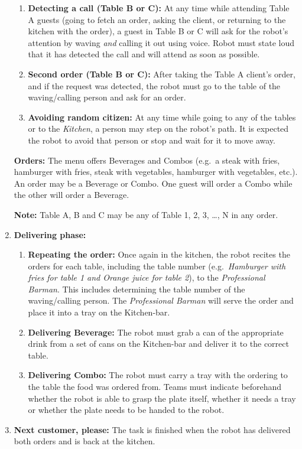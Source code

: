 \begin{enumerate}
\begin{enumerate}
		\item \textbf{Detecting a call (Table B or C):} At any time while attending Table A guests (going to fetch an order, asking the client, or returning to the kitchen with the order), a guest in Table B or C will ask for the robot's attention by waving \emph{and} calling it out using voice. Robot must state loud that it has detected the call and will attend as soon as possible.

		\item \textbf{Second order (Table B or C):} After taking the Table A client's order, and if the request was detected, the robot must go to the table of the waving/calling person and ask for an order.

		\item \textbf{Avoiding random citizen:} At any time while going to any of the tables or to the \textit{Kitchen}, a person may step on the robot's path. It is expected the robot to avoid that person or stop and wait for it to move away.
	\end{enumerate}

	\textbf{Orders:} The menu offers Beverages and Combos (e.g.~a steak with fries, hamburger with fries, steak with vegetables, hamburger with vegetables, etc.). An order may be a Beverage or Combo. One guest will order a Combo while the other will order a Beverage.

	\textbf{Note:} Table A, B and C may be any of Table 1, 2, 3, \dots, N in any order.

	\item \textbf{Delivering phase:}
	\begin{enumerate}
		\item \textbf{Repeating the order:} Once again in the kitchen, the robot recites the orders for each table, including the table number (e.g.~\textit{Hamburger with fries for table 1 and Orange juice for table 2}), to the \textit{Professional Barman}. This includes determining the table number of the waving/calling person. The \textit{Professional Barman} will serve the order and place it into a tray on the Kitchen-bar.

		\item \textbf{Delivering Beverage:} The robot must grab a can of the appropriate drink from a set of cans on the Kitchen-bar and deliver it to the correct table.

		\item \textbf{Delivering Combo:}  The robot must carry a tray with the ordering to the table the food was ordered from. Teams must indicate beforehand whether the robot is able to grasp the plate itself, whether it needs a tray or whether the plate needs to be handed to the robot.
	\end{enumerate}

	\item \textbf{Next customer, please:} The task is finished when the robot has delivered both orders and is back at the kitchen.
\end{enumerate}

